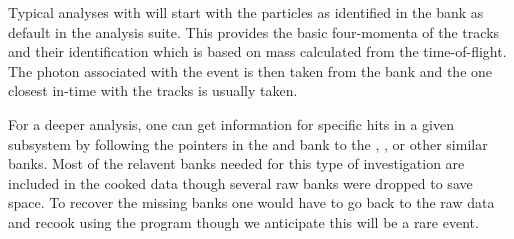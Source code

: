Typical analyses with  will start with the particles as identified in the  bank as default in the  analysis suite. This provides the basic four-momenta of the tracks and their identification which is based on mass calculated from the time-of-flight. The photon associated with the event is then taken from the  bank and the one closest in-time with the tracks is usually taken.

For a deeper analysis, one can get information for specific hits in a given subsystem by following the pointers in the  and  bank to the , ,  or other similar banks. Most of the relavent banks needed for this type of investigation are included in the cooked data though several raw banks were dropped to save space. To recover the missing banks one would have to go back to the raw data and recook using the  program though we anticipate this will be a rare event.






